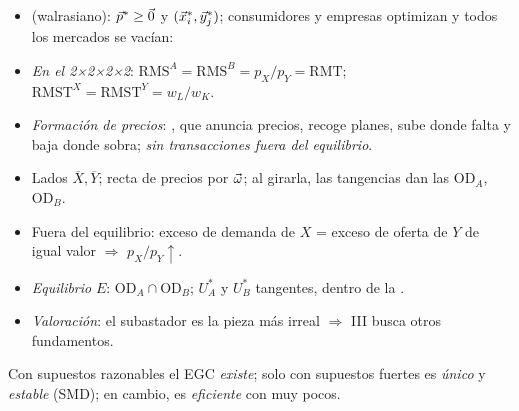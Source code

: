 \documentclass{article}
\begin{document}
\begin{columnas}
\begin{itemize}
\item {} (walrasiano): $\vec{p}^*\geq\vec{0}$ y $(\vec{x}^*_i,\vec{y}^*_j)$; consumidores y empresas optimizan y todos los mercados se vacían:
\item \emph{En el 2×2×2×2}: $\mathrm{RMS}^A=\mathrm{RMS}^B=p_X/p_Y=\mathrm{RMT}$; $\mathrm{RMST}^X=\mathrm{RMST}^Y=w_L/w_K$.
\item \emph{Formación de precios}: , que
anuncia precios, recoge planes, sube donde falta y baja donde sobra; \emph{sin transacciones fuera del equilibrio}.
\end{itemize}
\begin{itemize}
\item Lados $\overline{X},\overline{Y}$; recta de precios por $\vec{\omega}$; al girarla, las tangencias dan las  $\mathrm{OD}_A$, $\mathrm{OD}_B$.
\item Fuera del equilibrio: exceso de demanda de $X$ = exceso de oferta de $Y$ de igual valor $\Rightarrow$ $p_X/p_Y\uparrow$.
\item \emph{Equilibrio} $E$: $\mathrm{OD}_A\cap\mathrm{OD}_B$; $U^*_A$ y $U^*_B$ tangentes, dentro de la .
\end{itemize}
\begin{itemize}
\item \emph{Valoración}: el subastador es la pieza más irreal $\Rightarrow$ III busca otros fundamentos.
\end{itemize}

\begin{ideaclave}
Con supuestos razonables el EGC \emph{existe}; solo con supuestos fuertes es \emph{único} y \emph{estable} (SMD); en cambio, es \emph{eficiente} con muy pocos.
\end{ideaclave}


\end{columnas}
\end{document}
